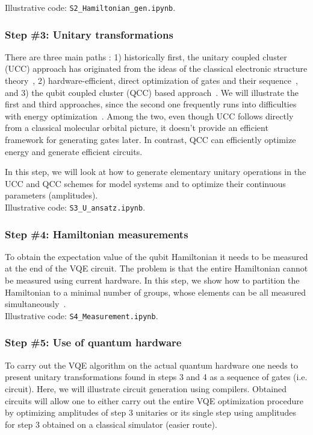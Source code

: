\documentclass[12pt]{article}
\begin{document}
Illustrative code: \texttt{S2\_Hamiltonian\_gen.ipynb}.

\subsubsection*{Step \#3: Unitary transformations}

There are three main paths : 1) historically first, the unitary coupled cluster (UCC) approach has originated from the ideas of the classical 
electronic structure theory~\cite{Romero2018,Hempel2018}, 
2) hardware-efficient, direct optimization of gates and their sequence~\cite{Kandala:2017/nature/242}, 
and 3)  the qubit coupled cluster (QCC) based approach~\cite{Ryabinkin2018}. 
We will illustrate the first and third approaches, since the second one frequently runs into difficulties with energy optimization~\cite{McClean2018}. 
Among the two, even though UCC follows directly from a classical molecular orbital picture, it doesn't provide an efficient framework 
for generating gates later. In contrast, QCC can efficiently optimize energy and generate efficient circuits.

In this step, we will look at how to generate elementary unitary operations in the UCC and QCC schemes for model 
systems and to optimize their continuous parameters (amplitudes). \\ 

Illustrative code: \texttt{S3\_U\_ansatz.ipynb}.

\subsubsection*{Step \#4: Hamiltonian measurements}

To obtain the expectation value of the qubit Hamiltonian it needs to be measured at the end of the VQE circuit. 
The problem is that the entire Hamiltonian cannot be measured using current hardware. 
In this step, we show how to partition the Hamiltonian to a minimal number of groups, whose elements can be all measured simultaneously~\cite{Verteletskyi:2020do,Yen2019b}.\\ 

Illustrative code: \texttt{S4\_Measurement.ipynb}.

\subsubsection*{Step \#5: Use of quantum hardware}

To carry out the VQE algorithm on the actual quantum hardware one needs to present unitary transformations found in steps 3 and 4 as a 
sequence of gates (i.e. circuit).  Here, we will illustrate circuit generation using compilers. Obtained circuits will allow one to either carry out 
the entire VQE optimization procedure by optimizing amplitudes of step 3 unitaries or its single step using amplitudes for step 3 obtained on a 
classical simulator (easier route). \\  
\end{document}
